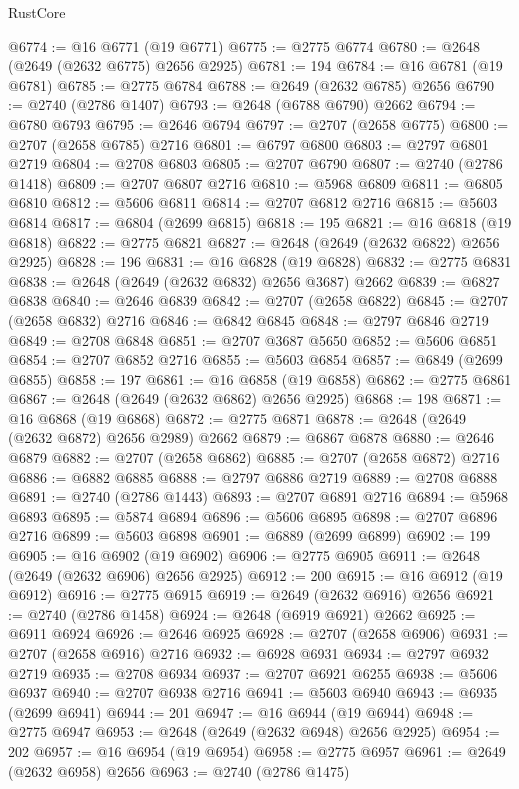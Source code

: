 \begin{lexlean}{RustCore}
\begin{coremodule}
@6774 := @16 @6771 (@19 @6771)
@6775 := @2775 @6774
@6780 := @2648 (@2649 (@2632 @6775) @2656 @2925)
@6781 := 194
@6784 := @16 @6781 (@19 @6781)
@6785 := @2775 @6784
@6788 := @2649 (@2632 @6785) @2656
@6790 := @2740 (@2786 @1407)
@6793 := @2648 (@6788 @6790) @2662
@6794 := @6780 @6793
@6795 := @2646 @6794
@6797 := @2707 (@2658 @6775)
@6800 := @2707 (@2658 @6785) @2716
@6801 := @6797 @6800
@6803 := @2797 @6801 @2719
@6804 := @2708 @6803
@6805 := @2707 @6790
@6807 := @2740 (@2786 @1418)
@6809 := @2707 @6807 @2716
@6810 := @5968 @6809
@6811 := @6805 @6810
@6812 := @5606 @6811
@6814 := @2707 @6812 @2716
@6815 := @5603 @6814
@6817 := @6804 (@2699 @6815)
@6818 := 195
@6821 := @16 @6818 (@19 @6818)
@6822 := @2775 @6821
@6827 := @2648 (@2649 (@2632 @6822) @2656 @2925)
@6828 := 196
@6831 := @16 @6828 (@19 @6828)
@6832 := @2775 @6831
@6838 := @2648 (@2649 (@2632 @6832) @2656 @3687) @2662
@6839 := @6827 @6838
@6840 := @2646 @6839
@6842 := @2707 (@2658 @6822)
@6845 := @2707 (@2658 @6832) @2716
@6846 := @6842 @6845
@6848 := @2797 @6846 @2719
@6849 := @2708 @6848
@6851 := @2707 @3687 @5650
@6852 := @5606 @6851
@6854 := @2707 @6852 @2716
@6855 := @5603 @6854
@6857 := @6849 (@2699 @6855)
@6858 := 197
@6861 := @16 @6858 (@19 @6858)
@6862 := @2775 @6861
@6867 := @2648 (@2649 (@2632 @6862) @2656 @2925)
@6868 := 198
@6871 := @16 @6868 (@19 @6868)
@6872 := @2775 @6871
@6878 := @2648 (@2649 (@2632 @6872) @2656 @2989) @2662
@6879 := @6867 @6878
@6880 := @2646 @6879
@6882 := @2707 (@2658 @6862)
@6885 := @2707 (@2658 @6872) @2716
@6886 := @6882 @6885
@6888 := @2797 @6886 @2719
@6889 := @2708 @6888
@6891 := @2740 (@2786 @1443)
@6893 := @2707 @6891 @2716
@6894 := @5968 @6893
@6895 := @5874 @6894
@6896 := @5606 @6895
@6898 := @2707 @6896 @2716
@6899 := @5603 @6898
@6901 := @6889 (@2699 @6899)
@6902 := 199
@6905 := @16 @6902 (@19 @6902)
@6906 := @2775 @6905
@6911 := @2648 (@2649 (@2632 @6906) @2656 @2925)
@6912 := 200
@6915 := @16 @6912 (@19 @6912)
@6916 := @2775 @6915
@6919 := @2649 (@2632 @6916) @2656
@6921 := @2740 (@2786 @1458)
@6924 := @2648 (@6919 @6921) @2662
@6925 := @6911 @6924
@6926 := @2646 @6925
@6928 := @2707 (@2658 @6906)
@6931 := @2707 (@2658 @6916) @2716
@6932 := @6928 @6931
@6934 := @2797 @6932 @2719
@6935 := @2708 @6934
@6937 := @2707 @6921 @6255
@6938 := @5606 @6937
@6940 := @2707 @6938 @2716
@6941 := @5603 @6940
@6943 := @6935 (@2699 @6941)
@6944 := 201
@6947 := @16 @6944 (@19 @6944)
@6948 := @2775 @6947
@6953 := @2648 (@2649 (@2632 @6948) @2656 @2925)
@6954 := 202
@6957 := @16 @6954 (@19 @6954)
@6958 := @2775 @6957
@6961 := @2649 (@2632 @6958) @2656
@6963 := @2740 (@2786 @1475)

\end{coremodule}
\end{lexlean}
